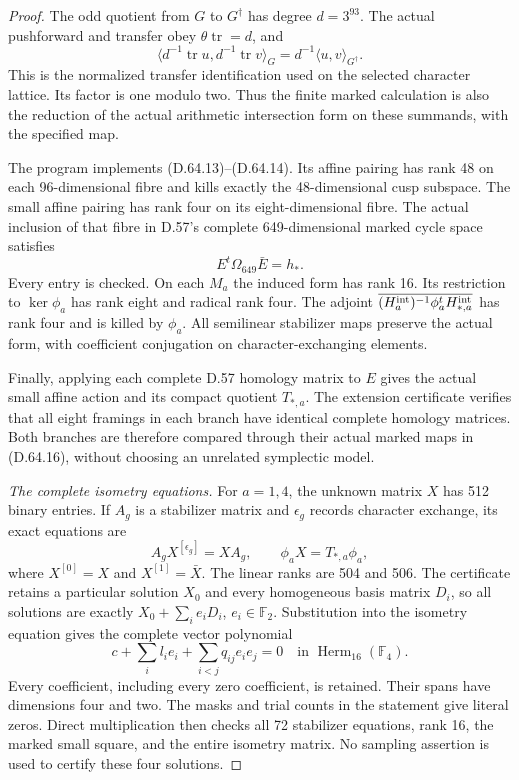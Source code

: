 \begin{proof}
The odd quotient from \(G\) to \(G^\dagger\) has
degree \(d=3^{93}\). The actual pushforward and
transfer obey \(\theta\operatorname{tr}=d\), and
\[
 \langle d^{-1}\operatorname{tr}u,
         d^{-1}\operatorname{tr}v\rangle_G
              =d^{-1}\langle u,v\rangle_{G^\dagger}.
 \tag{D.64.15}
\]
This is the normalized transfer identification
used on the selected character lattice.
Its factor is one modulo two. Thus the finite
marked calculation is also the reduction of the
actual arithmetic intersection form on these
summands, with the specified map.

The program 
implements (D.64.13)--(D.64.14). Its affine pairing
has rank 48 on each 96-dimensional fibre and
kills exactly the 48-dimensional cusp subspace.
The small affine pairing has rank four on its
eight-dimensional fibre. The actual inclusion
of that fibre in D.57's complete 649-dimensional
marked cycle space satisfies
\[
                   E^t\Omega_{649}\bar E=h_*.
 \tag{D.64.16}
\]
Every entry is checked. On each \(M_a\) the
induced form has rank 16. Its restriction to
\(\ker\phi_a\) has rank eight and radical rank
four. The adjoint
\(\overline{(H_a^{\rm int})^{-1}\phi_a^tH_{*,a}^{\rm int}}\)
has rank four and is killed by \(\phi_a\).
All semilinear stabilizer maps preserve the
actual form, with coefficient conjugation on
character-exchanging elements.

Finally, applying each complete D.57 homology
matrix to \(E\) gives the actual small affine
action and its compact quotient \(T_{*,a}\).
The extension certificate verifies that all
eight framings in each branch have identical
complete homology matrices. Both branches are
therefore compared through their actual marked
maps in (D.64.16), without choosing an unrelated
symplectic model.

\emph{The complete isometry equations.}
For \(a=1,4\), the unknown matrix \(X\) has
512 binary entries. If \(A_g\) is a stabilizer
matrix and \(\epsilon_g\) records character
exchange, its exact equations are
\[
 A_gX^{[\epsilon_g]}=XA_g,
 \qquad \phi_aX=T_{*,a}\phi_a,
 \tag{D.64.17}
\]
where \(X^{[0]}=X\) and
\(X^{[1]}=\bar X\).
The linear ranks are 504 and 506. The certificate
retains a particular solution \(X_0\) and every
homogeneous basis matrix \(D_i\), so all solutions
are exactly \(X_0+\sum_i e_iD_i\), \(e_i\in\mathbb F_2\).
Substitution into the isometry equation gives
the complete vector polynomial
\[
 c+\sum_i l_i e_i+\sum_{i<j}q_{ij}e_ie_j=0
       \quad\text{in }\operatorname{Herm}_{16}(\mathbb F_4).
 \tag{D.64.18}
\]
Every coefficient, including every zero coefficient,
is retained. Their spans have dimensions four
and two. The masks and trial counts in the
statement give literal zeros. Direct multiplication
then checks all 72 stabilizer equations, rank 16,
the marked small square, and the entire isometry
matrix. No sampling assertion is used to certify
these four solutions.


\end{proof}
